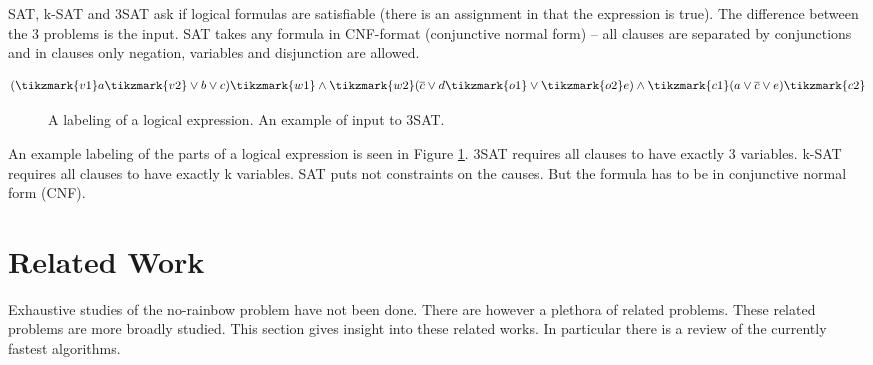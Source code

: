 \documentclass[msc,lith,english]{liuthesis}
\begin{document}
SAT, k-SAT and 3SAT ask if logical formulas are satisfiable (there is an assignment in that the expression is true).
The difference between the 3 problems is the input. SAT takes any formula in
CNF-format (conjunctive normal form) -- all clauses are separated by conjunctions and
in clauses only negation, variables and disjunction are allowed.

$$
  (\tikzmark{v1}a\tikzmark{v2} \vee b \vee c) \tikzmark{w1}\wedge\tikzmark{w2} (\overline{c} \vee d \tikzmark{o1}\vee\tikzmark{o2} e) \wedge \tikzmark{c1}(a \vee \overline{c} \vee e)\tikzmark{c2}
$$
\begin{figure}[h]
  \caption{A labeling of a logical expression. An example of input to 3SAT.}
  \label{figExSAT}
\end{figure}


An example labeling of the  parts of a logical expression is seen in Figure
\ref{figExSAT}. 3SAT requires all clauses to have exactly 3 variables. k-SAT requires all clauses to have exactly k variables. SAT puts not constraints on the causes. But the formula has to be in conjunctive normal form (CNF).




\chapter{Related Work}
Exhaustive studies of the no-rainbow problem have not been done. There are however a plethora of related problems.
These related problems are more broadly studied. This section gives insight
into these related works. In particular there is a review of the currently
fastest algorithms.
\end{document}
